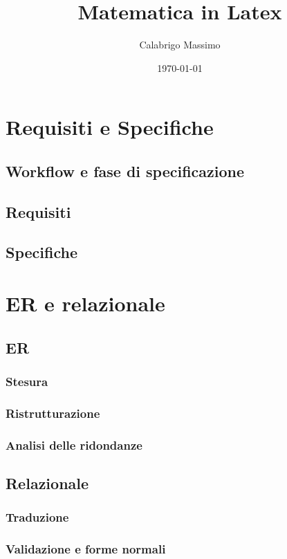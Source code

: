 \documentclass[11pt]{article}
\begin{document}
\title{Matematica in Latex}
\author{Calabrigo Massimo}
\date{\today}
\maketitle

\tableofcontents

\section{Requisiti e Specifiche}
\subsection{Workflow e fase di specificazione}
\subsection{Requisiti}
\subsection{Specifiche}


\section{ER e relazionale}
\subsection{ER}
\subsubsection{Stesura}
\subsubsection{Ristrutturazione}
\subsubsection{Analisi delle ridondanze}

\subsection{Relazionale}
\subsubsection{Traduzione}
\subsubsection{Validazione e forme normali}
\end{document}
